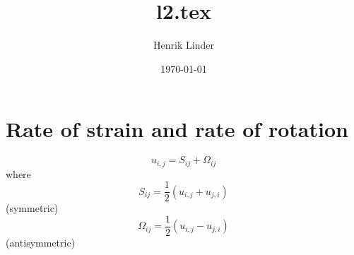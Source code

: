 \documentclass{article}
\title{l2.tex }
\author{Henrik Linder}
\date{\today}
\begin{document}
\maketitle


\section{Rate of strain and rate of rotation}

\begin{equation}
	u_{i,j} = S_{ij} + \Omega_{ij}
\end{equation}
where 
\begin{equation}
	S_{ij} = \frac{1}{2}(u_{i,j} + u_{j,i}  )
\end{equation}
(symmetric)
\begin{equation}
	\Omega_{ij} = \frac{1}{2}(u_{i,j} - u_{j,i}  )
\end{equation}
(antisymmetric)
\end{document}
